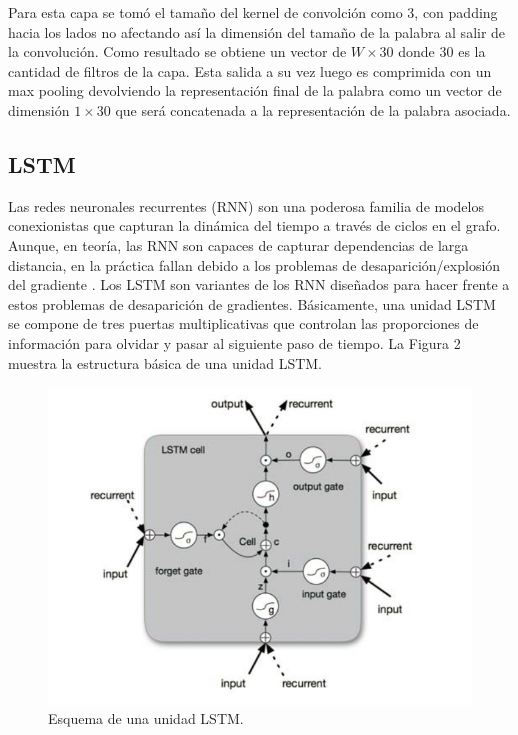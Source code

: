 \documentclass[runningheads]{llncs}
\begin{document}
\newpage

Para esta capa se tomó el tamaño del kernel de convolción como 3, con padding hacia los lados 
no afectando así la dimensión del tamaño de la palabra al salir de la convolución. Como resultado
se obtiene un vector de $W \times 30$ donde 30 es la cantidad de filtros de la capa. Esta salida a su vez
luego es comprimida con un max pooling devolviendo la representación final de la palabra como un
vector de dimensión $1 \times 30$ que será concatenada a la representación de la palabra asociada.

\subsection{LSTM}
	
Las redes neuronales recurrentes (RNN) son una poderosa familia de modelos conexionistas que capturan 
la dinámica del tiempo a través de ciclos en el grafo. Aunque, en teoría, las RNN son capaces de 
capturar dependencias de larga distancia, en la práctica fallan debido a los problemas de 
desaparición/explosión del gradiente . Los LSTM son variantes de los RNN diseñados para hacer frente a estos 
problemas de desaparición de gradientes. Básicamente, una unidad LSTM se compone de tres puertas
multiplicativas que controlan las proporciones de información para olvidar y pasar al siguiente 
paso de tiempo. La Figura 2 muestra la estructura básica de una unidad LSTM.

\begin{figure}
	\centering
	\includegraphics[width=12cm]{Fig_2.png}
	\caption{  Esquema de una unidad LSTM.}
	\label{F2}
\end{figure}
\end{document}
